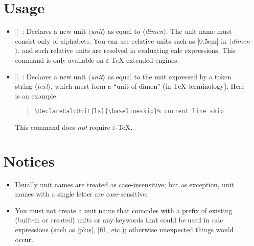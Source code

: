 \documentclass[a4paper]{article}
\newcommand{\Pkg}[1]{\textsf{#1}}
\newcommand{\Meta}[1]{$\langle$\textit{#1}$\rangle$}
\newcommand{\Means}{~:\quad}
\newcommand{\eTeX}{$\varepsilon$-{\TeX}}
\begin{document}
\section{Usage}

\begin{itemize}
\item |\newcalcunit{|\Meta{unit}|}{|\Meta{dimen}|}|\Means
Declares a new unit \Meta{unit} as equal to \Meta{dimen}.
The unit name must consist only of alphabets.
You can use relative units such as |0.5em| in \Meta{dimen},
and such relative units are resolved in
evaluating \Pkg{calc} expressions.
This command is only available on {\eTeX}-extended engines.

\item |\DeclareCalcUnit{|\Meta{unit}|}{|\Meta{text}|}|\Means
Declares a new unit \Meta{unit} as equal to the unit
expressed by a token string \Meta{text},
which must form a ``unit of dimen'' (in {\TeX} terminology).
Here is an example.
\begin{quote}\small\begin{verbatim}
\DeclareCalcUnit{ls}{\baselineskip}% current line skip
\end{verbatim}\end{quote}
This command does \emph{not} require \eTeX.

\end{itemize}

\section{Notices}

\begin{itemize}
\item Usually unit names are treated as case-insensitive;
but as exception, unit names with a single letter are
case-sensitive.
\item You must not create a unit name that coincides
with a prefix of existing (built-in or created) units
or any keywords that could be used in \Pkg{calc} expressions
(such as |plus|, |fil|, etc.); otherwise unexpected
things would occur.
\end{itemize}

\end{document}
